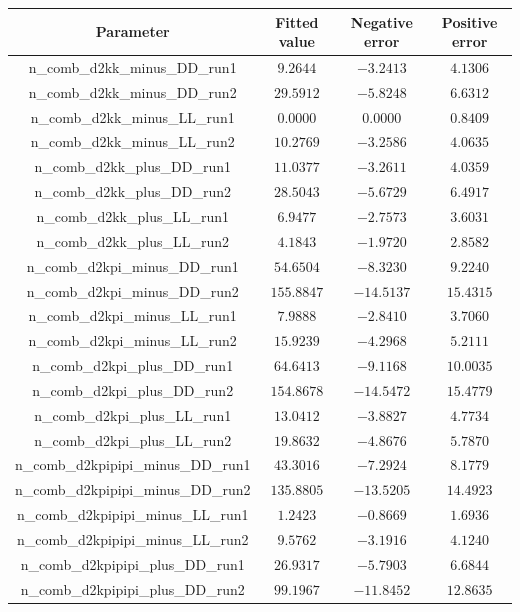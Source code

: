 \begin{table}[h]
\centering
{\tiny
\begin{tabular}{cccc}
Parameter & Fitted value & Negative error & Positive error \\
\hline
n\_comb\_d2kk\_minus\_DD\_run1 & $9.2644$ & $-3.2413$ & $4.1306$ \\
n\_comb\_d2kk\_minus\_DD\_run2 & $29.5912$ & $-5.8248$ & $6.6312$ \\
n\_comb\_d2kk\_minus\_LL\_run1 & $0.0000$ & $0.0000$ & $0.8409$ \\
n\_comb\_d2kk\_minus\_LL\_run2 & $10.2769$ & $-3.2586$ & $4.0635$ \\
n\_comb\_d2kk\_plus\_DD\_run1 & $11.0377$ & $-3.2611$ & $4.0359$ \\
n\_comb\_d2kk\_plus\_DD\_run2 & $28.5043$ & $-5.6729$ & $6.4917$ \\
n\_comb\_d2kk\_plus\_LL\_run1 & $6.9477$ & $-2.7573$ & $3.6031$ \\
n\_comb\_d2kk\_plus\_LL\_run2 & $4.1843$ & $-1.9720$ & $2.8582$ \\
n\_comb\_d2kpi\_minus\_DD\_run1 & $54.6504$ & $-8.3230$ & $9.2240$ \\
n\_comb\_d2kpi\_minus\_DD\_run2 & $155.8847$ & $-14.5137$ & $15.4315$ \\
n\_comb\_d2kpi\_minus\_LL\_run1 & $7.9888$ & $-2.8410$ & $3.7060$ \\
n\_comb\_d2kpi\_minus\_LL\_run2 & $15.9239$ & $-4.2968$ & $5.2111$ \\
n\_comb\_d2kpi\_plus\_DD\_run1 & $64.6413$ & $-9.1168$ & $10.0035$ \\
n\_comb\_d2kpi\_plus\_DD\_run2 & $154.8678$ & $-14.5472$ & $15.4779$ \\
n\_comb\_d2kpi\_plus\_LL\_run1 & $13.0412$ & $-3.8827$ & $4.7734$ \\
n\_comb\_d2kpi\_plus\_LL\_run2 & $19.8632$ & $-4.8676$ & $5.7870$ \\
n\_comb\_d2kpipipi\_minus\_DD\_run1 & $43.3016$ & $-7.2924$ & $8.1779$ \\
n\_comb\_d2kpipipi\_minus\_DD\_run2 & $135.8805$ & $-13.5205$ & $14.4923$ \\
n\_comb\_d2kpipipi\_minus\_LL\_run1 & $1.2423$ & $-0.8669$ & $1.6936$ \\
n\_comb\_d2kpipipi\_minus\_LL\_run2 & $9.5762$ & $-3.1916$ & $4.1240$ \\
n\_comb\_d2kpipipi\_plus\_DD\_run1 & $26.9317$ & $-5.7903$ & $6.6844$ \\
n\_comb\_d2kpipipi\_plus\_DD\_run2 & $99.1967$ & $-11.8452$ & $12.8635$ \\

\end{tabular}}
\end{table}

